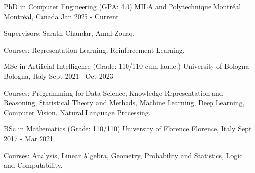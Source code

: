 

\begin{cventries}

 
 \begin{comment}
 \cventry
    {PhD in Computer Engineering} %
    {MILA and Polytechnique Montreal} %
    {Montreal, Canada} %
    {Aug 2024 - Present} %
    {
      \begin{cvitems} %
        \item {\textbf{Supervised by:} Sarath Chandar and Anbil Parthipan.}
      \end{cvitems}
    }
    \end{comment}
 
    \cventry
    {PhD in Computer Engineering (GPA: 4.0)} %
    {MILA and Polytechnique Montréal} %
    {Montréal, Canada} %
    {Jan 2025 - Current} %
    {
      \begin{cvitems} %
        \item {Supervisors: Sarath Chandar, Amal Zouaq.}
        \item {Courses: Representation Learning, Reinforcement Learning.}
      \end{cvitems}
    }
    
    \cventry
    {MSc in Artificial Intelligence (Grade: 110/110 cum laude.)} %
    {University of Bologna} %
    {Bologna, Italy} %
    {Sept 2021 - Oct 2023} %
    {
      \begin{cvitems} %
        \item {Courses: Programming for Data Science, Knowledge Representation and Reasoning, Statistical Theory and Methods, Machine Learning, Deep Learning, Computer Vision, Natural Language Processing.}
      \end{cvitems}
    }
    
  \cventry
    {BSc in Mathematics (Grade: 110/110)} %
    {University of Florence} %
    {Florence, Italy} %
    {Sept 2017 - Mar 2021} %
    {
      \begin{cvitems} %
        \item {Courses: Analysis, Linear Algebra, Geometry, Probability and Statistics, Logic and Computability.}
      \end{cvitems}
    }
    

\end{cventries}
